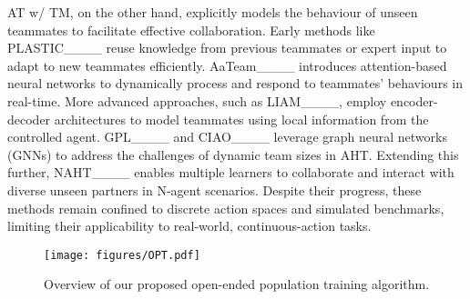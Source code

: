 AT w/ TM, on the other hand, explicitly models the behaviour of unseen teammates to facilitate effective collaboration. Early methods like PLASTIC____ reuse knowledge from previous teammates or expert input to adapt to new teammates efficiently. AaTeam____ introduces attention-based neural networks to dynamically process and respond to teammates’ behaviours in real-time.
More advanced approaches, such as LIAM____, employ encoder-decoder architectures to model teammates using local information from the controlled agent. GPL____ and CIAO____ leverage graph neural networks (GNNs) to address the challenges of dynamic team sizes in AHT. Extending this further, NAHT____ enables multiple learners to collaborate and interact with diverse unseen partners in N-agent scenarios.
Despite their progress, these methods remain confined to discrete action spaces and simulated benchmarks, limiting their applicability to real-world, continuous-action tasks. 

\begin{figure}
    \centering
    \texttt{[image: figures/OPT.pdf]}
    \caption{Overview of our proposed open-ended population training algorithm.}
    \label{fig:opt}
\end{figure}